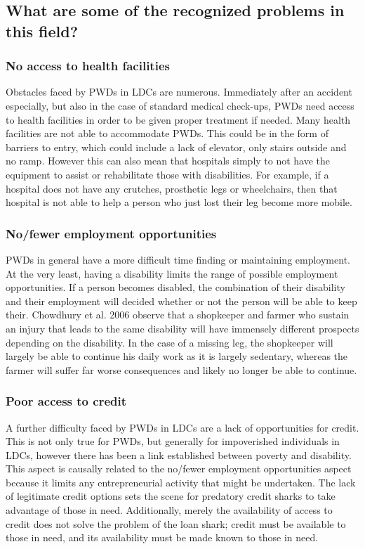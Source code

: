\documentclass{lps}
\begin{document}
\subsection{What are some of the recognized problems in this field?}

\subsubsection{No access to health facilities}

Obstacles faced by PWDs in LDCs are numerous. Immediately after an accident
especially, but also in the case of standard medical check-ups, PWDs need
access to health facilities in order to be given proper treatment if needed.
Many health facilities are not able to accommodate PWDs. This could be in the
form of barriers to entry, which could include a lack of elevator, only stairs
outside and no ramp. However this can also mean that hospitals simply to not
have the equipment to assist or rehabilitate those with disabilities. For
example, if a hospital does not have any crutches, prosthetic legs or
wheelchairs, then that hospital is not able to help a person who just lost
their leg become more mobile. 


\subsubsection{No/fewer employment opportunities}

PWDs in general have a more difficult time finding or maintaining employment.
At the very least, having a disability limits the range of possible employment
opportunities. If a person becomes disabled, the combination of their
disability and their employment will decided whether or not the person will be
able to keep their. Chowdhury et al. 2006 observe that a shopkeeper and farmer
who sustain an injury that leads to the same disability will have immensely
different prospects depending on the disability. In the case of a missing leg,
the shopkeeper will largely be able to continue his daily work as it is
largely sedentary, whereas the farmer will suffer far worse consequences and
likely no longer be able to continue.

\subsubsection{Poor access to credit}

A further difficulty faced by PWDs in LDCs are a lack of opportunities for
credit. This is not only true for PWDs, but generally for impoverished
individuals in LDCs, however there has been a link established between poverty
and disability. This aspect is causally related to the no/fewer employment
opportunities aspect because it limits any entrepreneurial activity that might
be undertaken. The lack of legitimate credit options sets the scene for
predatory credit sharks to take advantage of those in need. Additionally,
merely the availability of access to credit does not solve the problem of the
loan shark; credit must be available to those in need, and its availability
must be made known to those in need.
\end{document}
